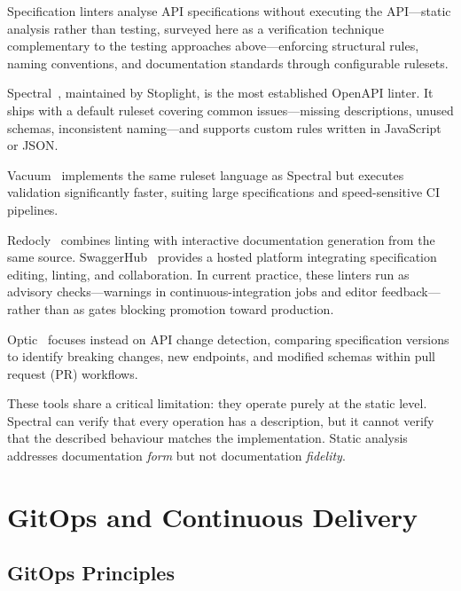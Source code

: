 Specification linters analyse API specifications without executing the API---static analysis rather than testing, surveyed here as a verification technique complementary to the testing approaches above---enforcing structural rules, naming conventions, and documentation standards through configurable rulesets.

Spectral~\cite{spectral}, maintained by Stoplight, is the most established OpenAPI linter. It ships with a default ruleset covering common issues---missing descriptions, unused schemas, inconsistent naming---and supports custom rules written in JavaScript or JSON.

Vacuum~\cite{vacuum} implements the same ruleset language as Spectral but executes validation significantly faster, suiting large specifications and speed-sensitive CI pipelines.

Redocly~\cite{redocly} combines linting with interactive documentation generation from the same source. SwaggerHub~\cite{swaggerhub} provides a hosted platform integrating specification editing, linting, and collaboration. In current practice, these linters run as advisory checks---warnings in continuous-integration jobs and editor feedback---rather than as gates blocking promotion toward production.

Optic~\cite{optic} focuses instead on API change detection, comparing specification versions to identify breaking changes, new endpoints, and modified schemas within pull request (PR) workflows.

These tools share a critical limitation: they operate purely at the static level. Spectral can verify that every operation has a description, but it cannot verify that the described behaviour matches the implementation. Static analysis addresses documentation \textit{form} but not documentation \textit{fidelity}.

\section{GitOps and Continuous Delivery}
\label{sec:gitops-cd}

\subsection{GitOps Principles}
\label{subsec:gitops-principles}

